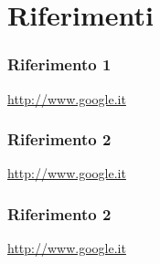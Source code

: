 
\chapter*{Riferimenti}

	\subsection*{Riferimento 1}
		\url{http://www.google.it}
		
	\subsection*{Riferimento 2}
		\url{http://www.google.it}

\subsection*{Riferimento 2}
\url{http://www.google.it}